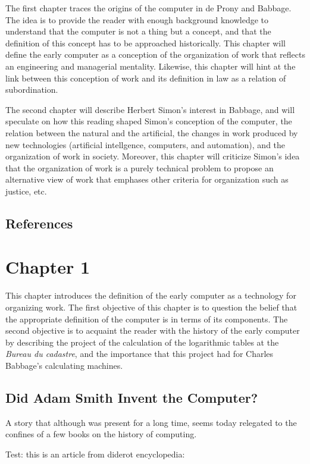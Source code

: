 \documentclass[version=last,draft=true,paper=A4,portrait,twoside=true,twocolumn=true,headinclude=false,footinclude=false,fontsize=10,BCOR=20mm,DIV=13,pagesize=auto,titlepage=false,mpinclude=false,open=right,chapterprefix=true,numbers=autoendperiod,headsepline=false,parskip=false]{scrbook}
\begin{document}
The first chapter traces the origins of the computer in de Prony and
Babbage. The idea is to provide the reader with enough background knowledge
to understand that the computer is not a thing but a concept, and that the
definition of this concept has to be approached historically. This chapter
will define the early computer as a conception of the organization of work
that reflects an engineering and managerial mentality. Likewise, this
chapter will hint at the link between this conception of work and its
definition in law as a relation of subordination.

The second chapter will describe Herbert Simon's interest in Babbage, and
will speculate on how this reading shaped Simon's conception of the
computer, the relation between the natural and the artificial, the changes
in work produced by new technologies (artificial intellgence, computers,
and automation), and the organization of work in society. Moreover, this
chapter will criticize Simon's idea that the organization of work is a
purely technical problem to propose an alternative view of work that
emphases other criteria for organization such as justice, etc.

\section*{References}
\printbibliography[heading=none,keyword=introduction]
\chapter{Chapter 1}
\label{sec:org76238a5}
This chapter introduces the definition of the early computer as a
technology for organizing work. The first objective of this chapter is to
question the belief that the appropriate definition of the computer is in
terms of its components. The second objective is to acquaint the reader
with the history of the early computer by describing the project of the
calculation of the logarithmic tables at the \emph{Bureau du cadastre}, and the
importance that this project had for Charles Babbage's calculating
machines.
\section{Did Adam Smith Invent the Computer?}
\label{sec:orgd3b731e}
A story that although was present for a long time, seems today relegated to
the confines of a few books on the history of computing. 

Test: this is an article from diderot encyclopedia:
\end{document}
